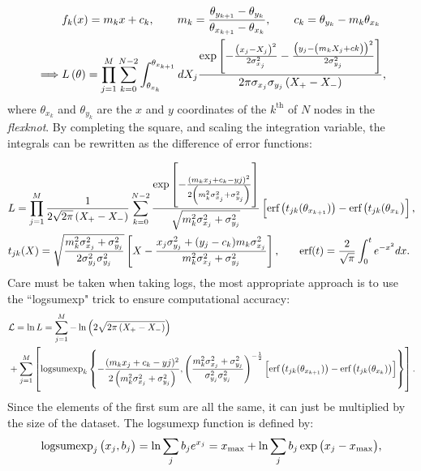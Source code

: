 \documentclass{article}
\begin{document}
\begin{equation}
\begin{aligned}
  & f_k(x) = m_k x + c_k, \qquad m_k = \frac{\theta_{y_{k+1}} - \theta_{y_k}}{\theta_{x_{k+1}} - \theta_{x_k}}, \qquad c_k = \theta_{y_k} - m_k \theta_{x_k} \\
  \implies & L\left(\mathbf{\theta}\right) =
  \prod_{j=1}^{M}\sum_{k=0}^{N-2}\int_{\theta_{x_k}}^{\theta_{x_{k+1}}}dX_j\frac{\exp{\left[-\frac{\left(x_j-X_j\right)^2}{2\sigma_{x_j}^2} -\frac{\left(y_j-\left(m_kX_j+ck\right)\right)^2}{2\sigma_{y_j}^2}\right]}}{2\pi\sigma_{x_j}\sigma_{y_j}\left(X_+-X_-\right)}\textrm,
\end{aligned}
\end{equation}
%
where $\theta_{x_k}$ and $\theta_{y_k}$ are the $x$ and $y$ coordinates of the $k^\textrm{th}$ of $N$ nodes in the \textit{flexknot}. By completing the square, and scaling the integration variable, the integrals can be rewritten as the difference of error functions:

\begin{equation}
\begin{aligned}
  & L = \prod_{j=1}^{M}\frac{1}{2\sqrt{2\pi}\left(X_+-X_-\right)}\sum_{k=0}^{N-2}
  \frac{\exp{\left[-\frac{(m_kx_j+c_k - yj)^2}{2\left(m_k^2\sigma_{x_j}^2+\sigma_{y_j}^2\right)}\right]}}
  {\sqrt{m_k^2\sigma_{x_j}^2+\sigma_{y_j}^2}}
  \left[\textrm{erf}\left(t_{jk}(\theta_{x_{k+1}})\right) - \textrm{erf}\left(t_{jk}(\theta_{x_k}\right)\right]\textrm, 
  \\
  & t_{jk}(X) = \sqrt{\frac{m_k^2\sigma_{x_j}^2+\sigma_{y_j}^2}{2\sigma_{y_j}^2\sigma_{y_j}^2}}
  \left[X - \frac{x_j\sigma_{y_j}^2 + (y_j-c_k)m_k\sigma_{x_j}^2}{m_k^2\sigma_{x_j}^2+\sigma_{y_j}^2}\right]\textrm, \qquad \textrm{erf}(t) = \frac{2}{\sqrt{\pi}}\int_0^t e^{-x^2}dx\textrm.
\end{aligned}
\end{equation}
%
Care must be taken when taking logs, the most appropriate approach is to use the ``logsumexp" trick to ensure computational accuracy:
%
\begin{equation}
\begin{aligned}
  &\mathcal{L} = \ln{L} = \sum_{j=1}^{M} -\ln{\left(2\sqrt{2\pi\left(X_+-X_-\right)}\right)}\\
  &+ \sum_{j=1}^{M} \left[\textrm{logsumexp}_k\left\{
  -\frac{(m_kx_j+c_k - yj)^2}{2\left(m_k^2\sigma_{x_j}^2+\sigma_{y_j}^2\right)}
  \textrm, 
  \left(\frac{m_k^2\sigma_{x_j}^2+\sigma_{y_j}^2}{\sigma_{y_j}^2\sigma_{y_j}^2}\right)^{-\frac{1}{2}}
  \left[\textrm{erf}\left(t_{jk}(\theta_{x_{k+1}})\right) - \textrm{erf}\left(t_{jk}(\theta_{x_k})\right)\right]
  \right\}
  \right]\textrm.
\end{aligned}
\end{equation}
%
Since the elements of the first sum are all the same, it can just be multiplied by the size of the dataset. The logsumexp function is defined by:
\begin{equation}
  \textrm{logsumexp}_j\left(x_j, b_j\right) = \ln{\sum_j b_j e^{x_j}}= x_\textrm{max} + \ln{\sum_j b_j \exp{\left(x_j-x_\textrm{max}\right)}} \textrm,
  \label{eq:logsumexp}
\end{equation}
\end{document}
